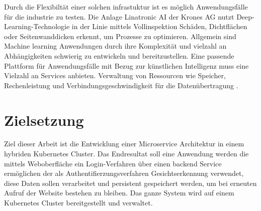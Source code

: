 Durch die Flexibiltät einer solchen infrastuktur ist es möglich Anwendungsfälle
für die industrie zu testen. Die Anlage Linatronic AI der Krones AG nutzt Deep-Learning-Technologie
in der Linie mittels Vollinspektion Schäden, Dichtflächen oder Seitenwanddicken
erkennt, um Prozesse zu optimieren. Allgemein sind Machine learning Anwendungen durch ihre Komplexität
und vielzahl an Abhängigkeiten schwierig zu entwickeln und bereitzustellen. 
Eine passende Plattform für Anwendungsfälle mit Bezug zur künstlichen Intelligenz
muss eine Vielzahl an Services anbieten. Verwaltung von Ressourcen wie Speicher,
Rechenleistung und Verbindungsgeschwindigkeit für die Datenübertragung \cite{mlops}. 

\section{Zielsetzung}
Ziel dieser Arbeit ist die Entwicklung einer Microservice
Architektur in einem hybriden Kubernetes Cluster. Das Endresultat
soll eine Anwendung werden die mittels Weboberfläche ein Login-Verfahren
über einen backend Service ermöglichen der als Authentifierzungsverfahren
Gesichtserkennung verwendet, diese Daten sollen verarbeitet und persistent 
gespeichert werden, um bei erneuten Aufruf der Website bestehen zu bleiben.
Das ganze System wird auf einem Kubernetes Cluster bereitgestellt und verwaltet.



